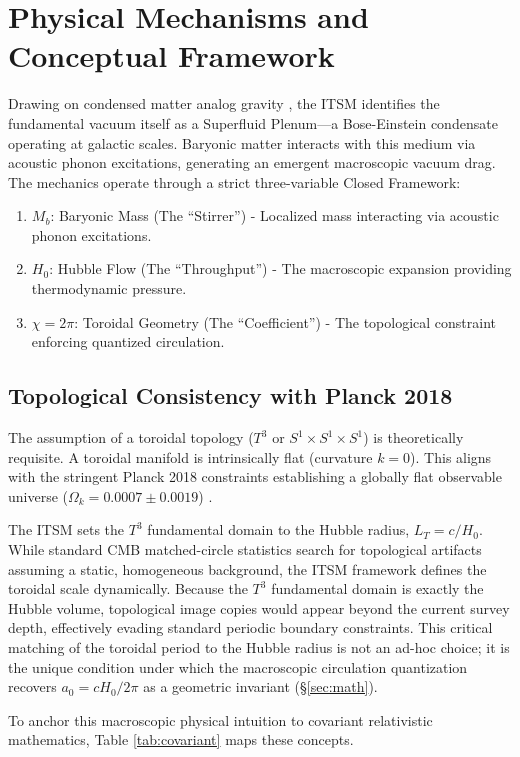 \documentclass[aps,prd,10pt,twocolumn,superscriptaddress,nofootinbib]{revtex4-2}
\begin{document}
\section{Physical Mechanisms and Conceptual Framework}
Drawing on condensed matter analog gravity \cite{barcelo, volovik}, the ITSM identifies the fundamental vacuum itself as a Superfluid Plenum---a Bose-Einstein condensate operating at galactic scales. Baryonic matter interacts with this medium via acoustic phonon excitations, generating an emergent macroscopic vacuum drag. The mechanics operate through a strict three-variable Closed Framework:
\begin{enumerate}
    \item $M_b$: Baryonic Mass (The ``Stirrer'') - Localized mass interacting via acoustic phonon excitations.
    \item $H_0$: Hubble Flow (The ``Throughput'') - The macroscopic expansion providing thermodynamic pressure.
    \item $\chi=2\pi$: Toroidal Geometry (The ``Coefficient'') - The topological constraint enforcing quantized circulation.
\end{enumerate}


\subsection{Topological Consistency with Planck 2018}
The assumption of a toroidal topology ($T^3$ or $S^1 \times S^1 \times S^1$) is theoretically requisite. A toroidal manifold is intrinsically flat (curvature $k=0$). This aligns with the stringent Planck 2018 constraints establishing a globally flat observable universe ($\Omega_k = 0.0007 \pm 0.0019$) \cite{planck}.

The ITSM sets the $T^3$ fundamental domain to the Hubble radius, $L_T = c/H_0$. While standard CMB matched-circle statistics \cite{planck_topology} search for topological artifacts assuming a static, homogeneous background, the ITSM framework defines the toroidal scale dynamically. Because the $T^3$ fundamental domain is exactly the Hubble volume, topological image copies would appear beyond the current survey depth, effectively evading standard periodic boundary constraints. This critical matching of the toroidal period to the Hubble radius is not an ad-hoc choice; it is the unique condition under which the macroscopic circulation quantization recovers $a_0 = cH_0/2\pi$ as a geometric invariant (\S\ref{sec:math}).

To anchor this macroscopic physical intuition to covariant relativistic mathematics, Table \ref{tab:covariant} maps these concepts.
\end{document}
